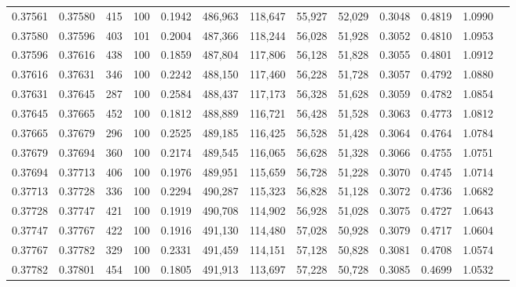 \begin{tabular}{rrrrrrrrrrrrr}
0.37561 & 0.37580 &   415 & 100 &                                     0.1942 & 486,963 & 118,647 &  55,927 &  52,029 & 0.3048 & 0.4819 & 1.0990 \\
0.37580 & 0.37596 &   403 & 101 &                                     0.2004 & 487,366 & 118,244 &  56,028 &  51,928 & 0.3052 & 0.4810 & 1.0953 \\
0.37596 & 0.37616 &   438 & 100 &                                     0.1859 & 487,804 & 117,806 &  56,128 &  51,828 & 0.3055 & 0.4801 & 1.0912 \\
0.37616 & 0.37631 &   346 & 100 &                                     0.2242 & 488,150 & 117,460 &  56,228 &  51,728 & 0.3057 & 0.4792 & 1.0880 \\
0.37631 & 0.37645 &   287 & 100 &                                     0.2584 & 488,437 & 117,173 &  56,328 &  51,628 & 0.3059 & 0.4782 & 1.0854 \\
0.37645 & 0.37665 &   452 & 100 &                                     0.1812 & 488,889 & 116,721 &  56,428 &  51,528 & 0.3063 & 0.4773 & 1.0812 \\
0.37665 & 0.37679 &   296 & 100 &                                     0.2525 & 489,185 & 116,425 &  56,528 &  51,428 & 0.3064 & 0.4764 & 1.0784 \\
0.37679 & 0.37694 &   360 & 100 &                                     0.2174 & 489,545 & 116,065 &  56,628 &  51,328 & 0.3066 & 0.4755 & 1.0751 \\
0.37694 & 0.37713 &   406 & 100 &                                     0.1976 & 489,951 & 115,659 &  56,728 &  51,228 & 0.3070 & 0.4745 & 1.0714 \\
0.37713 & 0.37728 &   336 & 100 &                                     0.2294 & 490,287 & 115,323 &  56,828 &  51,128 & 0.3072 & 0.4736 & 1.0682 \\
0.37728 & 0.37747 &   421 & 100 &                                     0.1919 & 490,708 & 114,902 &  56,928 &  51,028 & 0.3075 & 0.4727 & 1.0643 \\
0.37747 & 0.37767 &   422 & 100 &                                     0.1916 & 491,130 & 114,480 &  57,028 &  50,928 & 0.3079 & 0.4717 & 1.0604 \\
0.37767 & 0.37782 &   329 & 100 &                                     0.2331 & 491,459 & 114,151 &  57,128 &  50,828 & 0.3081 & 0.4708 & 1.0574 \\
0.37782 & 0.37801 &   454 & 100 &                                     0.1805 & 491,913 & 113,697 &  57,228 &  50,728 & 0.3085 & 0.4699 & 1.0532 \\

\end{tabular}
